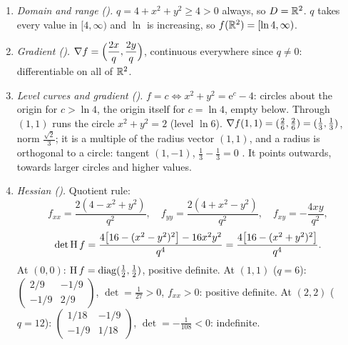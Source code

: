 \begin{solutions}
        \begin{enumerate}[label=(\alph*),leftmargin=1.8em,itemsep=0.4ex]
          \item \emph{Domain and range ().}
                $q=4+x^{2}+y^{2}\ge4>0$ always, so $D=\mathbb{R}^{2}$. $q$ takes
                every value in $[4,\infty)$ and $\ln$ is increasing, so
                $f(\mathbb{R}^{2})=[\ln4,\infty)$.
          \item \emph{Gradient ().}
                $\nabla f=\Bigl(\dfrac{2x}{q},\dfrac{2y}{q}\Bigr)$,
                continuous everywhere since $q\ne0$: differentiable on all
                of $\mathbb{R}^{2}$.
          \item \emph{Level curves and gradient ().}
                $f=c\iff x^{2}+y^{2}=\mathrm{e}^{c}-4$: circles about the
                origin for $c>\ln4$, the origin itself for $c=\ln4$, empty
                below. Through $(1,1)$ runs the circle $x^{2}+y^{2}=2$
                (level $\ln6$). $\nabla f(1,1)=(\tfrac26,\tfrac26)
                =(\tfrac13,\tfrac13)$, norm $\tfrac{\sqrt2}{3}$; it is a
                multiple of the radius vector $(1,1)$, and a radius is
                orthogonal to a circle: tangent $(1,-1)$,
                $\tfrac13-\tfrac13=0$ \checkmark. It points outwards,
                towards larger circles and higher values.
          \item \emph{Hessian ().} Quotient rule:
                \[
                  f_{xx}=\frac{2(4-x^{2}+y^{2})}{q^{2}},\quad
                  f_{yy}=\frac{2(4+x^{2}-y^{2})}{q^{2}},\quad
                  f_{xy}=-\frac{4xy}{q^{2}},
                \]
                \[
                  \det\operatorname{H} f=\frac{4\bigl[16-(x^{2}-y^{2})^{2}\bigr]
                  -16x^{2}y^{2}}{q^{4}}
                  =\frac{4\bigl[16-(x^{2}+y^{2})^{2}\bigr]}{q^{4}} .
                \]
                At $(0,0)$: $\operatorname{H} f=\mathrm{diag}(\tfrac12,\tfrac12)$,
                positive definite. At $(1,1)$ ($q=6$):
                $\begin{pmatrix}2/9&-1/9\\-1/9&2/9\end{pmatrix}$,
                $\det=\tfrac{1}{27}>0$, $f_{xx}>0$: positive definite. At
                $(2,2)$ ($q=12$):
                $\begin{pmatrix}1/18&-1/9\\-1/9&1/18\end{pmatrix}$,
                $\det=-\tfrac{1}{108}<0$: indefinite.

\end{enumerate}
\end{solutions}
